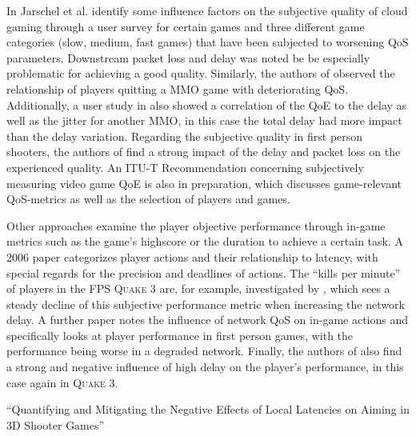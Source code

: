 In \cite{5976180} Jarschel et al. identify some influence factors on the subjective quality of cloud gaming through a user survey for certain games and three different game categories (slow, medium, fast games) that have been subjected to worsening \gls{QoS} parameters. Downstream packet loss and delay was noted be be especially problematic for achieving a good quality. Similarly, the authors of \cite{4591393} observed the relationship of players quitting a \gls{MMO} game with deteriorating \gls{QoS}. Additionally, a user study in \cite{4604397} also showed a correlation of the \gls{QoE} to the delay as well as the jitter for another \gls{MMO}, in this case the total delay had more impact than the delay variation. Regarding the subjective quality in first person shooters, the authors of \cite{6614351} find a strong impact of the delay and packet loss on the experienced quality. An ITU-T Recommendation \cite{mollertowards} concerning subjectively measuring video game \gls{QoE} is also in preparation, which discusses game-relevant \gls{QoS}-metrics as well as the selection of players and games.

Other approaches examine the player objective performance through in-game metrics such as the game's highscore or the duration to achieve a certain task. A 2006 paper \cite{Claypool:2006:LPA:1167838.1167860} categorizes player actions and their relationship to latency, with special regards for the precision and deadlines of actions. The ``kills per minute'' of players in the \gls{FPS} \textsc{Quake 3} are, for example, investigated by \cite{1266180}, which sees a steady decline of this subjective performance metric when increasing the network delay. A further paper \cite{claypool2007} notes the influence of network \gls{QoS} on in-game actions and specifically looks at player performance in first person games, with the performance being worse in a degraded network. Finally, the authors of \cite{Bredel:2010:MSR:1944796.1944797} also find a strong and negative influence of high delay on the player's performance, in this case again in \textsc{Quake 3}. 

``Quantifying and Mitigating the Negative Effects of Local Latencies on Aiming in 3D Shooter Games'' \cite{Ivkovic:2015:QMN:2702123.2702432}





